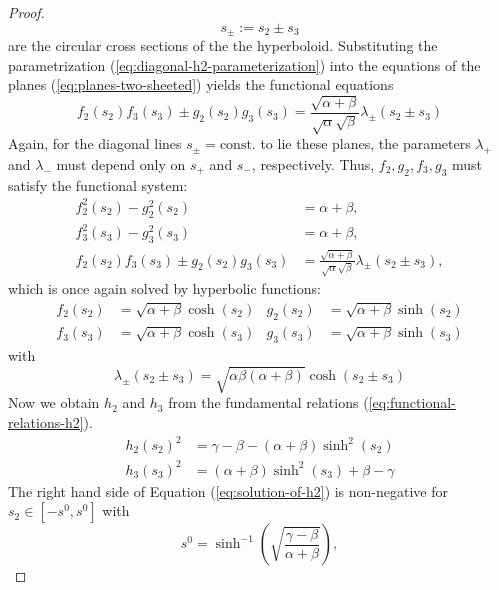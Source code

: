 \documentclass[10pt, a4paper]{article}
\theoremstyle{BoldTopSpacing}
\theoremstyle{BoldTopSpacing}
\theoremstyle{BoldTopSpacing}
\theoremstyle{BoldTopBottomSpacing}
\theoremstyle{BoldTopSpacing}
\theoremstyle{BoldTopBottomSpacing}
\theoremstyle{remark}
\begin{document}
\begin{proof}
\[
    s_{\pm} := s_{2} \pm s_{3}
\]
are the circular cross sections of the the hyperboloid. Substituting the parametrization (\ref{eq:diagonal-h2-parameterization}) into the equations of the planes (\ref{eq:planes-two-sheeted}) yields the functional equations
\begin{equation}
\label{extra-plane-equation-h2}
f_{2}(s_{2}) f_{3}(s_{3}) \pm g_{2}(s_{2}) g_{3}(s_{3}) = \frac{\sqrt{\alpha+\beta}}{\sqrt{\alpha} \sqrt{\beta}} \lambda_{\pm}(s_{2} \pm s_{3})
\end{equation}
Again, for the diagonal lines $s_{\pm} = \text{const.}$ to lie these planes, the parameters $\lambda_{+}$ and $\lambda_{-}$ must depend only on $s_{+}$ and $s_{-}$, respectively. Thus, $f_2, g_2, f_3, g_3$ must satisfy the functional system:
\begin{equation*}
\begin{aligned}
f_{2}^2(s_{2}) - g_{2}^2(s_{2}) &= \alpha + \beta, \\
f_{3}^2(s_{3}) - g_{3}^2(s_{3}) &= \alpha + \beta, \\
f_{2}(s_{2}) f_{3}(s_{3}) \pm g_{2}(s_{2}) g_{3}(s_{3}) &= \frac{\sqrt{\alpha+\beta}}{\sqrt{\alpha} \sqrt{\beta}} \lambda_{\pm}(s_{2} \pm s_{3}),
\end{aligned}
\end{equation*}
which is once again solved by hyperbolic functions:
\begin{equation*}
\begin{aligned}
f_{2}(s_{2}) &= \sqrt{\alpha + \beta} \cosh(s_{2}) & g_{2}(s_{2}) &= \sqrt{\alpha + \beta} \sinh(s_{2}) \\
f_{3}(s_{3}) &= \sqrt{\alpha + \beta} \cosh(s_{3}) & g_{3}(s_{3}) &= \sqrt{\alpha + \beta} \sinh(s_{3})
\end{aligned}
\end{equation*}
with
\[
\lambda_{\pm}(s_{2} \pm s_{3}) = \sqrt{ \alpha \beta (\alpha + \beta) } \cosh(s_{2} \pm s_{3})
\]
Now we obtain $h_{2}$ and $h_{3}$ from the fundamental relations (\ref{eq:functional-relations-h2}).
\begin{align}
h_{2}(s_{2})^2 &= \gamma - \beta - (\alpha + \beta) \sinh^2(s_{2}) \label{eq:solution-of-h2} \\
h_{3}(s_{3})^2 &= (\alpha + \beta) \sinh^2(s_{3}) + \beta - \gamma \label{eq:solution-of-h3}
\end{align}
The right hand side of Equation (\ref{eq:solution-of-h2}) is non-negative for $s_{2} \in [-s^{0}, s^{0}]$ with
\[
    s^{0} = \sinh^{-1}\left( \sqrt{\frac{\gamma - \beta}{\alpha + \beta}} \right),
\]
\end{proof}
\end{document}
